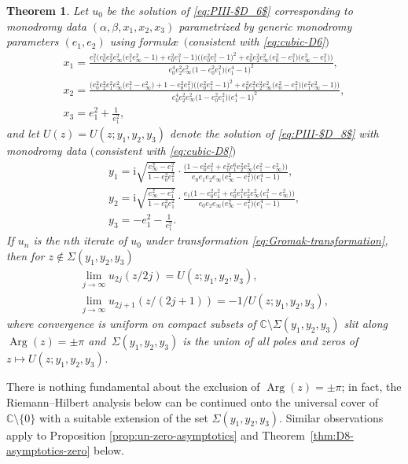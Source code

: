 \documentclass[pdftex]{sigma}
\numberwithin{equation}{section}
\newtheorem{Theorem}{Theorem}[section]
\newcommand{\ii}{\mathrm{i}}
\newcommand{\C}{{\mathbb{C}}}
\renewcommand{\arg}{\operatorname{Arg}}
\begin{document}
\begin{Theorem}\label{thm:general}
 Let $u_0$ be the solution of \eqref{eq:PIII-$D_6$} corresponding to monodromy data $(\alpha, \beta, x_1, x_2, x_3)$ parametrized by generic monodromy parameters $(e_1,e_2)$ using formul\ae\ $($consistent with \eqref{eq:cubic-D6}$)$
 \begin{gather}%
 x_1=
 \frac{e_1^2 \big(e_0^2 e_2^2e_\infty^2 \big(e_1^2 e_\infty^2-1\big)+e_0^2 e_1^2-1\big)\big(\big(e_0^2 e_1^2-1\big)^2 + e_0^2e_2^2e_\infty^2 \big(e_0^2-e_1^2\big) \big(e_\infty^2-e_1^2\big)\big)}{e_0^4 e_2^2e_\infty^2\big(1-e_0^2 e_1^2\big)\big(e_1^4-1\big)^2 },\label{eq:x1}
\\
 x_2= \frac{\big(e_0^2 e_2^2 e_1^2e_\infty^2 \big(e_1^2-e_\infty^2\big)+1-e_0^2 e_1^2\big) \big(\big(e_0^2 e_1^2-1\big)^2\!+e_0^2 e_1^2e_2^2 e_\infty^2 \big(e_0^2-e_1^2\big) \big(e_1^2 e_\infty^2\!-1\big)\big)}{e_0^4e_2^2e_\infty^2 \big(1-e_0^2 e_1^2\big) \big(e_1^4-1\big)^2 }, \!\!\!\!
\\
 x_3=
 e_1^2+\frac{1}{e_1^2},\label{eq:x3}
\end{gather}
and let $U(z)=U(z;y_1,y_2,y_3)$ denote the solution of \eqref{eq:PIII-$D_8$} with monodromy data $($consistent with \eqref{eq:cubic-D8}$)$
 \begin{gather}
 y_1 = \ii\sqrt{\frac{e_\infty^2-e_1^2}{1-e_0^2 e_1^2}} \cdot\frac{ \big(1-e_0^2 e_1^2+e_0^2e_1^6e_2^2e_
 \infty^2\big(e_1^2-e_\infty^2\big)\big)}{e_0 e_1 e_2 e_\infty\big( e_\infty^2-e_1^2\big) \big(e_1^4-1\big) },
 \label{eq:y1}
\\
 y_2 = \ii\sqrt{\frac{e_\infty^2-e_1^2}{1-e_0^2 e_1^2}} \cdot\frac{e_1 \big(1-e_0^2 e_1^2+e_0^2e_1^2e_2^2e_
 \infty^2\big(e_1^2-e_\infty^2\big)\big)}{e_0e_2 e_\infty \big( e_\infty^2-e_1^2\big) \big(e_1^4-1\big)},
 \label{eq:y2}
 \\
 y_3 = -e_1^2-\frac{1}{e_1^2}.
 \label{eq:y3}
 \end{gather}
If $u_n$ is the $n$th iterate of $u_0$ under transformation \eqref{eq:Gromak-transformation}, then for $z\notin \Sigma(y_1,y_2,y_3)$
 \begin{gather*}
 \lim_{j \to \infty} u_{2j}(z/2j) = U(z;y_1,y_2,y_3),\\ \lim_{j \to \infty} u_{2j+1}(z/(2j+1)) = -1/U(z;y_1,y_2,y_3),
 \end{gather*}
where convergence is uniform on compact subsets of $\C\setminus \Sigma(y_1, y_2, y_3)$ slit along $\arg(z)= \pm \pi$ and~$\Sigma(y_1,y_2,y_3)$ is the union of all poles and zeros of $z\mapsto U(z;y_1,y_2,y_3)$.
\end{Theorem}
There is nothing fundamental about the exclusion of $\arg(z) = \pm \pi$; in fact, the Riemann--Hilbert analysis below can be continued onto the universal cover of $\C \setminus \{0\}$ with a suitable extension of the set $\Sigma(y_1, y_2, y_3)$. Similar observations apply to Proposition \ref{prop:un-zero-asymptotics} and Theorem~\ref{thm:D8-asymptotics-zero} below.
\end{document}
